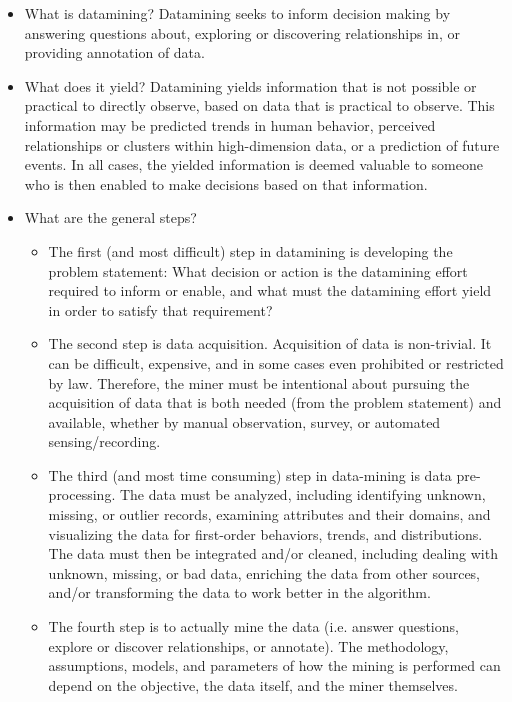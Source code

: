 \documentclass[fleqn,10pt]{SelfArx} %
\begin{document}
\begin{itemize}[noitemsep]

\item What is datamining?  Datamining seeks to inform decision making by answering questions about, exploring or discovering relationships in, or providing annotation of data.

\item What does it yield?  Datamining yields information that is not possible or practical to directly observe, based on data that is practical to observe.  This information may be predicted trends in human behavior, perceived relationships or clusters within high-dimension data, or a prediction of future events.  In all cases, the yielded information is deemed valuable to someone who is then enabled to make decisions based on that information.

\item What are the general steps?  

\begin{itemize}
	
	\item The first (and most difficult) step in datamining is developing the problem statement: What decision or action is the datamining effort required to inform or enable, and what must the datamining effort yield in order to satisfy that requirement?
	
	\item The second step is data acquisition.  Acquisition of data is non-trivial.  It can be difficult, expensive, and in some cases even prohibited or restricted by law.  Therefore, the miner must be intentional about pursuing the acquisition of data that is both needed (from the problem statement) and available, whether by manual observation, survey, or automated sensing/recording.
	
	\item The third (and most time consuming) step in data-mining is data pre-processing.  The data must be analyzed, including identifying unknown, missing, or outlier records, examining attributes and their domains, and visualizing the data for first-order behaviors, trends, and distributions.  The data must then be integrated and/or cleaned, including dealing with unknown, missing, or bad data, enriching the data from other sources, and/or transforming the data to work better in the algorithm.
	
	\item The fourth step is to actually mine the data (i.e. answer questions, explore or discover relationships, or annotate).  The methodology, assumptions, models, and parameters of how the mining is performed can depend on the objective, the data itself, and the miner themselves.
	

\end{itemize}
\end{itemize}
\end{document}
